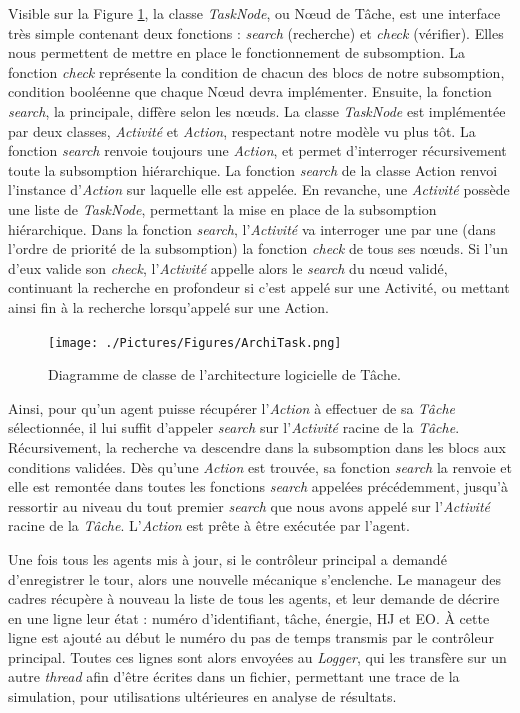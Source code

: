 			Visible sur la Figure \ref{ArchiTask}, la classe \textit{TaskNode}, ou Nœud de Tâche, est une interface très simple contenant deux fonctions : \textit{search} (recherche) et \textit{check} (vérifier). Elles nous permettent de mettre en place le fonctionnement de subsomption. La fonction \textit{check} représente la condition de chacun des blocs de notre subsomption, condition booléenne que chaque Nœud devra implémenter. Ensuite, la fonction \textit{search}, la principale, diffère selon les nœuds. La classe \textit{TaskNode} est implémentée par deux classes, \textit{Activité} et \textit{Action}, respectant notre modèle vu plus tôt. La fonction \textit{search} renvoie toujours une \textit{Action}, et permet d'interroger récursivement toute la subsomption hiérarchique. La fonction \textit{search} de la classe Action renvoi l'instance d'\textit{Action} sur laquelle elle est appelée. En revanche, une \textit{Activité} possède une liste de \textit{TaskNode}, permettant la mise en place de la subsomption hiérarchique. Dans la fonction \textit{search}, l'\textit{Activité} va interroger une par une (dans l'ordre de priorité de la subsomption) la fonction \textit{check} de tous ses nœuds. Si l'un d'eux valide son \textit{check}, l'\textit{Activité} appelle alors le \textit{search} du nœud validé, continuant la recherche en profondeur si c'est appelé sur une Activité, ou mettant ainsi fin à la recherche lorsqu'appelé sur une Action.
			
			\begin{figure}
			\centering
			\texttt{[image: ./Pictures/Figures/ArchiTask.png]}
			\caption{Diagramme de classe de l'architecture logicielle de Tâche.}
			\label{ArchiTask}
			\end{figure}
			
			Ainsi, pour qu'un agent puisse récupérer l'\textit{Action} à effectuer de sa \textit{Tâche} sélectionnée, il lui suffit d'appeler \textit{search} sur l'\textit{Activité} racine de la \textit{Tâche}. Récursivement, la recherche va descendre dans la subsomption dans les blocs aux conditions validées. Dès qu'une \textit{Action} est trouvée, sa fonction \textit{search} la renvoie et elle est remontée dans toutes les fonctions \textit{search} appelées précédemment, jusqu'à ressortir au niveau du tout premier \textit{search} que nous avons appelé sur l'\textit{Activité} racine de la \textit{Tâche}. L'\textit{Action} est prête à être exécutée par l'agent.
			
			
			Une fois tous les agents mis à jour, si le contrôleur principal a demandé d'enregistrer le tour, alors une nouvelle mécanique s'enclenche. Le manageur des cadres récupère à nouveau la liste de tous les agents, et leur demande de décrire en une ligne leur état : numéro d'identifiant, tâche, énergie, HJ et EO. À cette ligne est ajouté au début le numéro du pas de temps transmis par le contrôleur principal. Toutes ces lignes sont alors envoyées au \textit{Logger}, qui les transfère sur un autre \textit{thread} afin d'être écrites dans un fichier, permettant une trace de la simulation, pour utilisations ultérieures en analyse de résultats.
			
